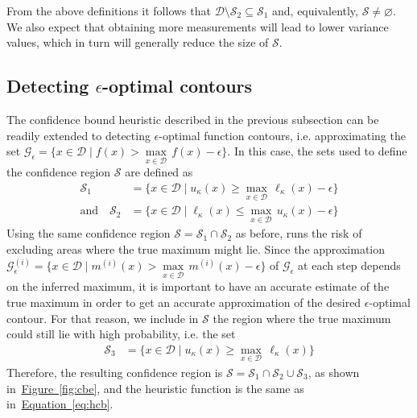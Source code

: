 \documentclass[11pt]{article} %
\newcommand{\figref}[1]{\hyperref[#1]{\mbox{Figure~\ref*{#1}}}}
\newcommand{\eqtref}[1]{\hyperref[#1]{\mbox{Equation~\ref*{#1}}}}
\begin{document}
From the above definitions it follows that 
$\mathcal{D}\setminus\mathcal{S}_2\subseteq\mathcal{S}_1$
and, equivalently, $\mathcal{S}\neq\varnothing$. We also expect that
obtaining more measurements will lead to lower variance values, which in turn
will generally reduce the size of $\mathcal{S}$.

\subsection{Detecting $\epsilon$-optimal contours}
The confidence bound heuristic described in the previous subsection can be
readily extended to detecting $\epsilon$-optimal function contours,
i.e. approximating the set
${\mathcal{G}_{\epsilon} = \{x \in \mathcal{D} \mid f(x) > \underset{x \in \mathcal{D}}{\max}\,f(x) - \epsilon\}}$.
In this case, the sets used to define the confidence region $\mathcal{S}$
are defined as
\begin{align*}
  \mathcal{S}_1 &= \{x \in \mathcal{D} \mid u_{\kappa}(x) \geq \underset{x \in \mathcal{D}}{\max}\,\ell_{\kappa}(x) - \epsilon\}\\
  \text{and}\hspace{1em}
  \mathcal{S}_2 &= \{x \in \mathcal{D} \mid \ell_{\kappa}(x) \leq \underset{x \in \mathcal{D}}{\max}\,u_{\kappa}(x) - \epsilon\}
\end{align*}
Using the same confidence region $\mathcal{S} = \mathcal{S}_1\cap\mathcal{S}_2$
as before, runs the risk of excluding areas where the true maximum might lie.
Since the approximation
${\mathcal{G}^{(i)}_\epsilon = \{x \in \mathcal{D} \mid m^{(i)}(x) > \underset{x \in \mathcal{D}}{\max}\,m^{(i)}(x) - \epsilon\}}$
of $\mathcal{G}_{\epsilon}$ at each step
depends on the inferred maximum, it is important to have an accurate estimate
of the true maximum in order to get an accurate approximation of the desired
$\epsilon$-optimal contour. For that reason, we include in $\mathcal{S}$ the
region where the true maximum could still lie with high probability, i.e.
the set
\begin{align*}
  \mathcal{S}_3 &= \{x \in \mathcal{D} \mid u_{\kappa}(x) \geq \underset{x \in \mathcal{D}}{\max}\,\ell_{\kappa}(x)\}
\end{align*}
Therefore, the resulting confidence region is
$\mathcal{S} = \mathcal{S}_1\cap\mathcal{S}_2\cup\mathcal{S}_3$, as shown
in~\figref{fig:cbe}, and the heuristic function is the same as
in~\eqtref{eq:hcb}.
\end{document}
